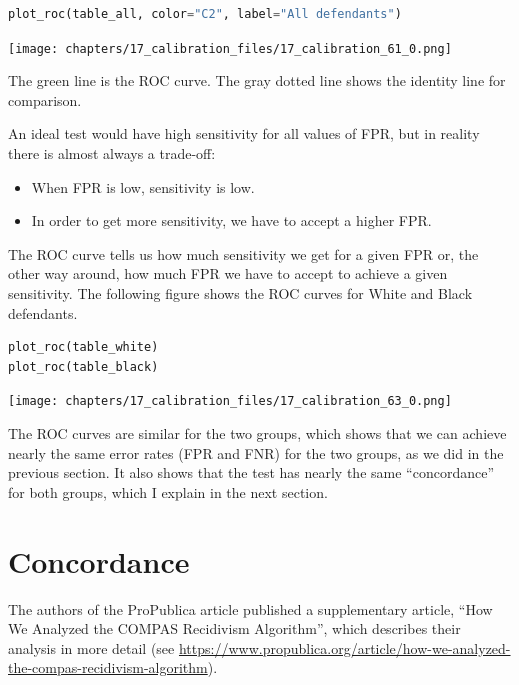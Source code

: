 \begin{lstlisting}[language=Python,style=source]
plot_roc(table_all, color="C2", label="All defendants")
\end{lstlisting}

\begin{center}
\texttt{[image: chapters/17\_calibration\_files/17\_calibration\_61\_0.png]}
\end{center}

The green line is the ROC curve. The gray dotted line shows the identity
line for comparison.

An ideal test would have high sensitivity for all values of FPR, but in
reality there is almost always a trade-off:

\begin{itemize}
\item
  When FPR is low, sensitivity is low.
\item
  In order to get more sensitivity, we have to accept a higher FPR.
\end{itemize}

The ROC curve tells us how much sensitivity we get for a given FPR or,
the other way around, how much FPR we have to accept to achieve a given
sensitivity. The following figure shows the ROC curves for White and
Black defendants.

\begin{lstlisting}[language=Python,style=source]
plot_roc(table_white)
plot_roc(table_black)
\end{lstlisting}

\begin{center}
\texttt{[image: chapters/17\_calibration\_files/17\_calibration\_63\_0.png]}
\end{center}

The ROC curves are similar for the two groups, which shows that we can
achieve nearly the same error rates (FPR and FNR) for the two groups, as
we did in the previous section. It also shows that the test has nearly
the same ``concordance'' for both groups, which I explain in the next
section.

\section{Concordance}\label{concordance}

The authors of the ProPublica article published a supplementary article,
``How We Analyzed the COMPAS Recidivism Algorithm'', which describes
their analysis in more detail (see
\url{https://www.propublica.org/article/how-we-analyzed-the-compas-recidivism-algorithm}).

